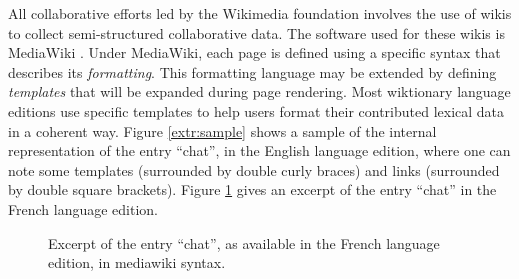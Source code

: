 \documentclass[10pt, a4paper]{article}
\begin{document}
All collaborative efforts led by the Wikimedia foundation involves the use of wikis to collect semi-structured collaborative data. The software used for these wikis is MediaWiki \cite{mediawiki.org}. Under MediaWiki, each page is defined using a specific syntax that describes its \emph{formatting}. This formatting language may be extended by defining \emph{templates} that will be expanded during page rendering. 
Most wiktionary language editions use specific templates to help users format their contributed lexical data in a coherent way. Figure \ref{extr:sample} shows a sample of the internal representation of the entry ``chat'', in the English language edition, where one can note some templates (surrounded by double curly braces) and links (surrounded by double square brackets). Figure \ref{extr:samplefr} gives an excerpt of the entry ``chat'' in the French language edition.

\begin{figure}[htb]
\caption{Excerpt of the entry ``chat'', as available in the French language edition, in mediawiki syntax.}
\label{extr:samplefr}
\end{figure}
\end{document}
